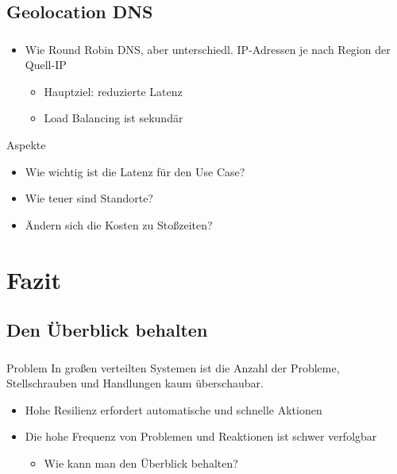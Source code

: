 \subsection{Geolocation DNS}
\begin{frame}
    \frametitle{\insertsection}
    \framesubtitle{\insertsubsection}

    \begin{itemize}
    	\item Wie Round Robin DNS, aber unterschiedl. IP-Adressen je nach Region der Quell-IP
		\begin{itemize}
			\item Hauptziel: reduzierte Latenz
			\item Load Balancing ist sekundär
		\end{itemize}
    \end{itemize}

    \begin{block}{Aspekte}
    	\begin{itemize}
    		\item Wie wichtig ist die Latenz für den Use Case?
    		\item Wie teuer sind Standorte?
    		\item Ändern sich die Kosten zu Stoßzeiten?
    	\end{itemize}
    \end{block}

\end{frame}

\section{Fazit}

\subsection{Den Überblick behalten}
\begin{frame}
	\frametitle{\insertsection}
    \framesubtitle{\insertsubsection}

    \begin{block}{Problem}
    In großen verteilten Systemen ist die Anzahl der Probleme, Stellschrauben und Handlungen kaum überschaubar.
    	\begin{itemize}
    		\item Hohe Resilienz erfordert automatische und schnelle Aktionen
    		\item Die hohe Frequenz von Problemen und Reaktionen ist schwer verfolgbar
    		\begin{itemize}
    			\item Wie kann man den Überblick behalten?
    		\end{itemize}
    	\end{itemize}
    \end{block}
\end{frame}

